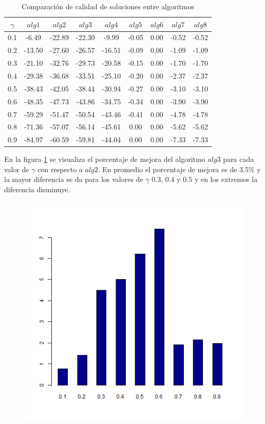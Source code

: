 \begin{table}[H]
\begin{center}
\begin{tabular}{|c|c|c|c|c|c|c|c|c|}
\hline
$\gamma$&$alg1$&$alg2$&$alg3$&$alg4$&$alg5$&$alg6$&$alg7$&$alg8$ \\ \hline
0.1 & -6.49 & -22.89 & -22.30 & -9.99 & -0.05 & 0.00 & -0.52 & -0.52 \\
0.2 & -13.50 & -27.60 & -26.57 & -16.51 & -0.09 & 0.00 & -1.09 & -1.09 \\
0.3 & -21.10 & -32.76 & -29.73 & -20.58 & -0.15 & 0.00 & -1.70 & -1.70 \\
0.4 & -29.38 & -36.68 & -33.51 & -25.10 & -0.20 & 0.00 & -2.37 & -2.37 \\
0.5 & -38.43 & -42.05 & -38.44 & -30.94 & -0.27 & 0.00 & -3.10 & -3.10 \\
0.6 & -48.35 & -47.73 & -43.86 & -34.75 & -0.34 & 0.00 & -3.90 & -3.90 \\
0.7 & -59.29 & -51.47 & -50.54 & -43.46 & -0.41 & 0.00 & -4.78 & -4.78 \\
0.8 & -71.36 & -57.07 & -56.14 & -45.61 & 0.00 & 0.00 & -5.62 & -5.62 \\
0.9 & -84.97 & -60.59 & -59.81 & -44.04 & 0.00 & 0.00 & -7.33 & -7.33 \\
\hline 
\end{tabular}
\caption{Comparación de calidad de soluciones entre algoritmos} 
\label{tabla:comp4}
\end{center}
\end{table}

En la figura \ref{res:cit_bobo_diff} se visualiza el porcentaje de mejora del algoritmo $alg3$ para cada valor de $\gamma$ con respecto a $alg2$. En promedio el porcentaje de mejora es de $3.5\%$ y la mayor diferencia se da para los valores de $\gamma$ $0.3$, $0.4$ y $0.5$
y en los extremos la diferencia disminuye.
\begin{figure}[H]
  \centering
    \includegraphics[width=1\textwidth]{img/cit_bobo_diff.png}
  \caption{}
  \label{res:cit_bobo_diff}
\end{figure}
